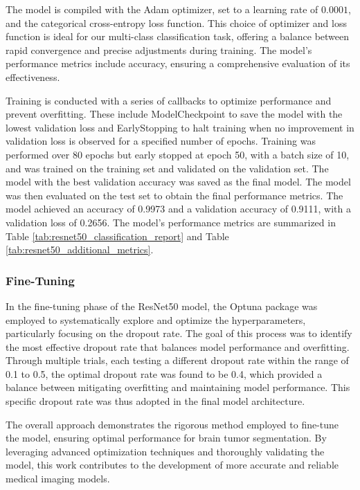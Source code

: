The model is compiled with the Adam optimizer, set to a learning rate of $0.0001$, and the categorical cross-entropy loss function. This choice of optimizer and loss function is ideal for our multi-class classification task, offering a balance between rapid convergence and precise adjustments during training. The model's performance metrics include accuracy, ensuring a comprehensive evaluation of its effectiveness.

Training is conducted with a series of callbacks to optimize performance and prevent overfitting. These include ModelCheckpoint to save the model with the lowest validation loss and EarlyStopping to halt training when no improvement in validation loss is observed for a specified number of epochs. Training was performed over 80 epochs but early stopped at epoch 50, with a batch size of 10, and was trained on the training set and validated on the validation set. The model with the best validation accuracy was saved as the final model. The model was then evaluated on the test set to obtain the final performance metrics. The model achieved an accuracy of 0.9973 and a validation accuracy of 0.9111, with a validation loss of 0.2656. The model's performance metrics are summarized in Table \ref{tab:resnet50_classification_report} and Table \ref{tab:resnet50_additional_metrics}.

\subsubsection{Fine-Tuning}

In the fine-tuning phase of the ResNet50 model, the Optuna package was employed to systematically explore and optimize the hyperparameters, particularly focusing on the dropout rate. The goal of this process was to identify the most effective dropout rate that balances model performance and overfitting. Through multiple trials, each testing a different dropout rate within the range of 0.1 to 0.5, the optimal dropout rate was found to be 0.4, which provided a balance between mitigating overfitting and maintaining model performance. This specific dropout rate was thus adopted in the final model architecture.

The overall approach demonstrates the rigorous method employed to fine-tune the model, ensuring optimal performance for brain tumor segmentation. By leveraging advanced optimization techniques and thoroughly validating the model, this work contributes to the development of more accurate and reliable medical imaging models.

